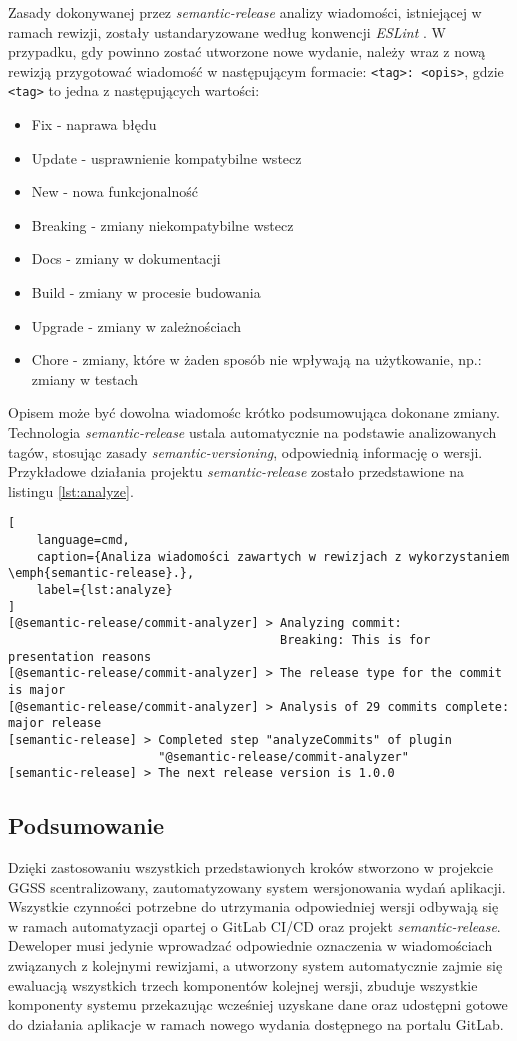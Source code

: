 Zasady dokonywanej przez \emph{semantic-release} analizy wiadomości, istniejącej w ramach rewizji, zostały ustandaryzowane według konwencji \emph{ESLint} \cite{eslint}. W przypadku, gdy powinno zostać utworzone nowe wydanie, należy wraz z nową rewizją przygotować wiadomość w następującym formacie: \lstinline{<tag>: <opis>}, gdzie \lstinline{<tag>} to jedna z następujących wartości:
\begin{itemize}
    \item Fix - naprawa błędu
    \item Update - usprawnienie kompatybilne wstecz
    \item New - nowa funkcjonalność
    \item Breaking - zmiany niekompatybilne wstecz
    \item Docs - zmiany w dokumentacji
    \item Build - zmiany w procesie budowania
    \item Upgrade - zmiany w zależnościach
    \item Chore - zmiany, które w żaden sposób nie wpływają na użytkowanie, np.: zmiany w testach
\end{itemize}
Opisem może być dowolna wiadomośc krótko podsumowująca dokonane zmiany. Technologia \emph{semantic-release} ustala automatycznie na podstawie analizowanych tagów, stosując zasady \emph{semantic-versioning}, odpowiednią informację o wersji. Przykładowe działania projektu \emph{semantic-release} zostało przedstawione na listingu \ref{lst:analyze}.

\begin{lstlisting}[
    language=cmd, 
    caption={Analiza wiadomości zawartych w rewizjach z wykorzystaniem \emph{semantic-release}.}, 
    label={lst:analyze}
]
[@semantic-release/commit-analyzer] > Analyzing commit: 
                                      Breaking: This is for presentation reasons
[@semantic-release/commit-analyzer] > The release type for the commit is major
[@semantic-release/commit-analyzer] > Analysis of 29 commits complete: major release
[semantic-release] > Completed step "analyzeCommits" of plugin 
                     "@semantic-release/commit-analyzer"
[semantic-release] > The next release version is 1.0.0
\end{lstlisting}

\subsection{Podsumowanie}
Dzięki zastosowaniu wszystkich przedstawionych kroków stworzono w projekcie GGSS scentralizowany, zautomatyzowany system wersjonowania wydań aplikacji. Wszystkie czynności potrzebne do utrzymania odpowiedniej wersji odbywają się w ramach automatyzacji opartej o GitLab CI/CD oraz projekt \emph{semantic-release}. Deweloper musi jedynie wprowadzać odpowiednie oznaczenia w wiadomościach związanych z kolejnymi rewizjami, a utworzony system automatycznie zajmie się ewaluacją wszystkich trzech komponentów kolejnej wersji, zbuduje wszystkie komponenty systemu przekazując wcześniej uzyskane dane oraz udostępni gotowe do działania aplikacje w ramach nowego wydania dostępnego na portalu GitLab.
